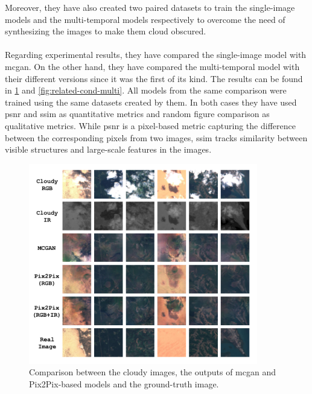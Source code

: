 \documentclass[11pt, a4paper]{article}
\begin{document}
	Moreover, they have also created two paired datasets to train the single-image models and the multi-temporal models respectively to overcome the need of synthesizing the images to make them cloud obscured.
	\\
	\\
	Regarding experimental results, they have compared the single-image model with \gls{mcgan}. On the other hand, they have compared the multi-temporal model with their different versions since it was the first of its kind. The results can be found in \ref{fig:related-cond-single} and \ref{fig:related-cond-multi}. All models from the same comparison were trained using the same datasets created by them. In both cases they have used \gls{psnr} and \gls{ssim} as quantitative metrics and random figure comparison as qualitative metrics. While \gls{psnr} is a pixel-based metric capturing the difference between the corresponding pixels from two images, \gls{ssim} tracks similarity between visible structures and large-scale features in the images.
	\begin{figure}[H]
		\captionsetup{justification=centering}
		\centering
		\includegraphics[width=10cm]{imgs/relatedwork/conditional-single-image.png}
		\caption{Comparison between the cloudy images, the outputs of \gls{mcgan} and Pix2Pix-based models and the ground-truth image.}
		\label{fig:related-cond-single}
	\end{figure}
\end{document}
